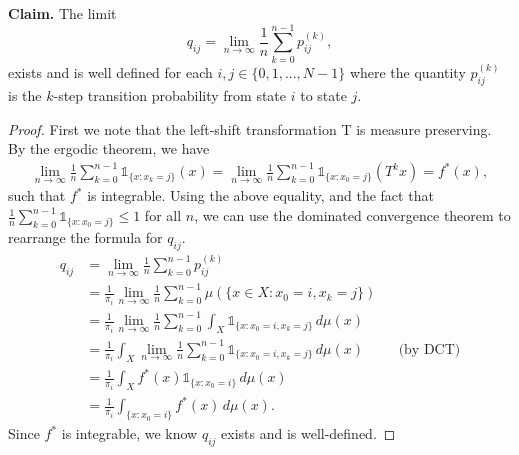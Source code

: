 \documentclass{article}
\begin{document}
 
\noindent \textbf{Claim.} The limit 
$$q_{ij} = \lim_{n\rightarrow\infty} \frac{1}{n} \sum\limits_{k=0}^{n-1} p_{ij}^{(k)},$$ 
exists and is well defined for each $i,j \in \{0, 1, ..., N - 1\}$ where the quantity $p_{ij}^{(k)}$
is the $k$-step transition probability from state $i$ to state $j$. 

\begin{proof} 
    First we note that the left-shift transformation T is measure preserving. By the ergodic theorem, we have
    \begin{align*}
        \lim_{n\rightarrow\infty} \frac{1}{n} \sum\limits_{k=0}^{n-1} \mathds{1}_{\{x : x_k = j\}}(x) =  
        \lim_{n\rightarrow\infty} \frac{1}{n} \sum\limits_{k=0}^{n-1} \mathds{1}_{\{x : x_0 = j\}}(T^{k}x) = f^*(x), 
    \end{align*}
    such that $f^*$ is integrable. Using the above equality, and the fact that $\frac{1}{n} \sum\limits_{k=0}^{n-1} \mathds{1}_{\{x : x_0 = j\}} \leq 1$
    for all $n$, we can use the dominated convergence theorem to rearrange the formula for $q_{ij}$. 
    \begin{align*}
        q_{ij} &= \lim_{n\rightarrow\infty} \frac{1}{n} \sum\limits_{k=0}^{n-1} p_{ij}^{(k)} \\
        &= \frac{1}{\pi_i} \lim_{n\rightarrow\infty} \frac{1}{n} \sum\limits_{k=0}^{n-1} \mu(\{x \in X : x_0 = i, x_k = j\}) \\
        &= \frac{1}{\pi_i} \lim_{n\rightarrow\infty} \frac{1}{n} \sum\limits_{k=0}^{n-1} \int_{X} \mathds{1}_{\{x:x_0=i, x_k=j\}}\, d\mu(x) \\
        &= \frac{1}{\pi_i} \int_{X} \lim_{n\rightarrow\infty} \frac{1}{n} \sum\limits_{k=0}^{n-1} \mathds{1}_{\{x:x_0=i, x_k=j\}}\, d\mu(x) &&\text{(by DCT)}\\
        &= \frac{1}{\pi_i} \int_{X} f^*(x) \mathds{1}_{\{x:x_0=i\}}\, d\mu(x) \\
        &= \frac{1}{\pi_i} \int_{\{x:x_0=i\}} f^*(x)\, d\mu(x). 
    \end{align*}
    Since $f^*$ is integrable, we know $q_{ij}$ exists and is well-defined. 
\end{proof}
\end{document}
